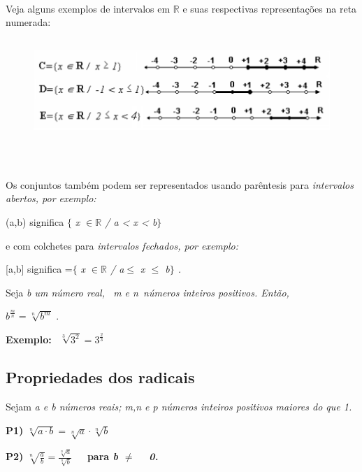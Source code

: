~~

Veja alguns exemplos de intervalos em  \( \mathbb{R} \) e suas respectivas representações na reta numerada:

\begin{figure}[H]
	\begin{Center}
		\includegraphics[width=5.72in,height=1.53in]{capitulos/conjuntos_numericos/media/image10.pdf}
	\end{Center}
\end{figure}

~~

Os conjuntos também podem ser representados usando parêntesis para \textit{intervalos abertos, por exemplo:}

(a,b) significa $ \{ $ \textit{ x \( \in \mathbb{R} \)  / a < x < b$ \} $ }

e com colchetes para \textit{intervalos fechados, por exemplo:}

[a,b] significa =$ \{ $ \textit{ x \( \in \mathbb{R} \)  / a$\leq$  x $\leq$  b$ \} $ .}

\begin{caixa}
	\begin{tdefinicao}

	Seja \textit{b um número real,~ m e n~números inteiros positivos.  Então,}

	\quad   \( b^{\frac{m}{n}}=\sqrt[n]{b^{m}} \) { .}
	\end{tdefinicao}
\end{caixa}
\textbf{Exemplo: \( ~~\sqrt[3]{3^{2}}=3^{\frac{2}{3}} \) ~ \qedsymbol{}}

\subsection{Propriedades dos radicais}

Sejam \textit{a e b números reais; m,n e p números inteiros positivos maiores do que 1.}

\textbf{P1)  \( \sqrt[n]{a \cdot b}=\sqrt[n]{a} \cdot \sqrt[n]{b} \) }

\textbf{P2)  \( \sqrt[n]{\frac{a}{b}}=\frac{\sqrt[n]{a}}{\sqrt[n]{b}} \) ~~para  \textit{b $ \neq $ ~ 0.}}

